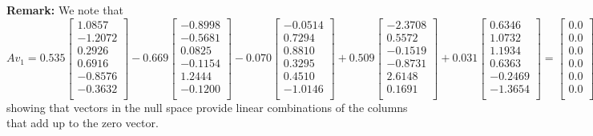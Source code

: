 \vspace*{.2cm}
\textbf{Remark:} We note that 
$$A v_1= 0.535 \left[
\begin{array}{r}
1.0857 \\
-1.2072 \\
0.2926 \\
0.6916 \\
-0.8576 \\
-0.3632 \\
\end{array}
\right] -0.669
\left[
\begin{array}{r}
-0.8998 \\
-0.5681 \\
0.0825 \\
-0.1154 \\
1.2444 \\
-0.1200 \\
\end{array}
\right]
-0.070
\left[
\begin{array}{r}
-0.0514 \\
0.7294 \\
0.8810 \\
0.3295 \\
0.4510 \\
-1.0146 \\
\end{array}
\right]
+ 0.509
\left[
\begin{array}{r}
-2.3708 \\
0.5572 \\
-0.1519 \\
-0.8731 \\
2.6148 \\
0.1691 \\
\end{array}
\right]
+0.031
\left[
\begin{array}{r}
0.6346 \\
1.0732 \\
1.1934 \\
0.6363 \\
-0.2469 \\
-1.3654 \\
\end{array}
\right]
 = \left[
\begin{array}{r}
0.0 \\
0.0 \\
0.0 \\
0.0 \\
0.0 \\
0.0 \\
\end{array}
\right],$$
showing that vectors in the null space provide linear combinations of the columns that add up to the zero vector.


